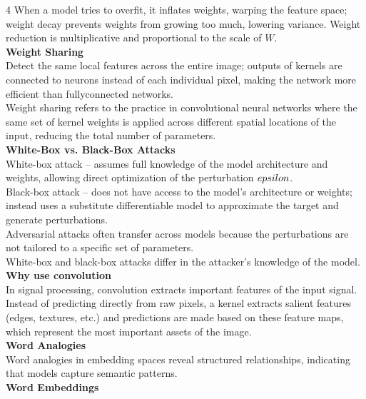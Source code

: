 \documentclass[8pt]{extarticle}
\begin{document}
\begin{multicols}{4}
When a model tries to overfit, it inflates weights, warping the feature space; weight decay prevents weights from growing too much, lowering variance. Weight reduction is multiplicative and proportional to the scale of $W$.\\
\vspace{2pt}\textbf{Weight Sharing}\\
Detect the same local features across the entire image; outputs of kernels are connected to neurons instead of each individual pixel, making the network more efficient than fully\-connected networks.\\
Weight sharing refers to the practice in convolutional neural networks where the same set of kernel weights is applied across different spatial locations of the input, reducing the total number of parameters.\\
\vspace{2pt}\textbf{White-Box vs. Black-Box Attacks}\\
White-box attack -- assumes full knowledge of the model architecture and weights, allowing direct optimization of the perturbation $\\epsilon$.\\
Black-box attack -- does not have access to the model’s architecture or weights; instead uses a substitute differentiable model to approximate the target and generate perturbations.\\
Adversarial attacks often transfer across models because the perturbations are not tailored to a specific set of parameters.\\
White-box and black-box attacks differ in the attacker’s knowledge of the model.\\
\vspace{2pt}\textbf{Why use convolution}\\
In signal processing, convolution extracts important features of the input signal. Instead of predicting directly from raw pixels, a kernel extracts salient features (edges, textures, etc.) and predictions are made based on these feature maps, which represent the most important assets of the image.\\
\vspace{2pt}\textbf{Word Analogies}\\
Word analogies in embedding spaces reveal structured relationships, indicating that models capture semantic patterns.\\
\vspace{2pt}\textbf{Word Embeddings}\\

\end{multicols}
\end{document}
